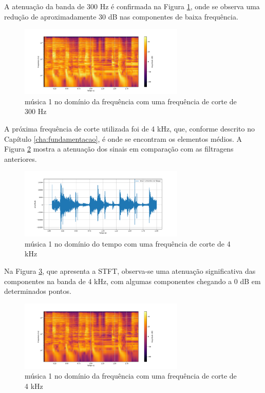 A atenuação da banda de 300 Hz é confirmada na Figura \ref{fig29}, onde se observa uma redução de aproximadamente 30 dB nas componentes de baixa frequência.

\begin{figure}[h]
    \centering
    \includegraphics[width=0.7\textwidth]{figuras/fig29.png}
    \caption{música 1 no domínio da frequência com uma frequência de corte de 300 Hz}
    \label{fig29}
\end{figure}

A próxima frequência de corte utilizada foi de 4 kHz, que, conforme descrito no Capítulo \ref{cha:fundamentacao}, é onde se encontram os elementos médios. A Figura \ref{fig26} mostra a atenuação dos sinais em comparação com as filtragens anteriores.

\begin{figure}[h]
    \centering
    \includegraphics[width=0.7\textwidth]{figuras/fig26.png}
    \caption{música 1 no domínio do tempo com uma frequência de corte de 4 kHz}
    \label{fig26}
\end{figure}

Na Figura \ref{fig27}, que apresenta a STFT, observa-se uma atenuação significativa das componentes na banda de 4 kHz, com algumas componentes chegando a 0 dB em determinados pontos.

\begin{figure}[h]
    \centering
    \includegraphics[width=0.7\textwidth]{figuras/fig27.png}
    \caption{música 1 no domínio da frequência com uma frequência de corte de 4 kHz}
    \label{fig27}
\end{figure}

